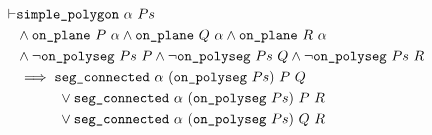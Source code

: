\begin{align*}
\vdash &\code{simple\_polygon}\ \alpha\ Ps\\
       &\wedge \code{on\_plane}\ P\ \alpha \wedge \code{on\_plane}\ Q\ \alpha \wedge \code{on\_plane}\ R\ \alpha\\
       &\wedge \neg\code{on\_polyseg}\ Ps\ P\wedge \neg\code{on\_polyseg}\ Ps\ Q\wedge \neg\code{on\_polyseg}\ Ps\ R\\
       &\implies \code{seg\_connected}\ \alpha\ (\code{on\_polyseg}\ Ps)\ P\ Q\\
       &\qquad\quad\vee \code{seg\_connected}\ \alpha\ (\code{on\_polyseg}\ Ps)\ P\ R\\
       &\qquad\quad\vee \code{seg\_connected}\ \alpha\ (\code{on\_polyseg}\ Ps)\ Q\ R
\end{align*}



  

